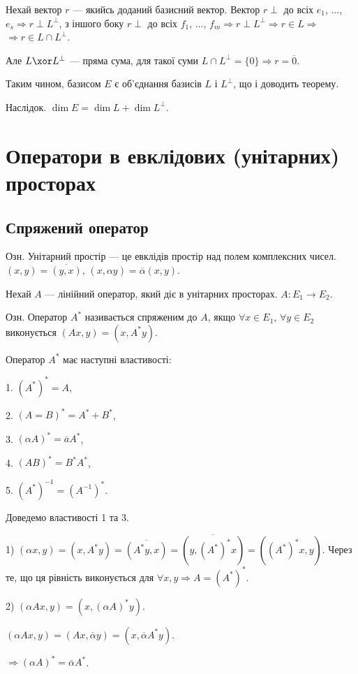Нехай вектор $r$ --- якийсь доданий базисний вектор. Вектор $r \perp$ до всіх
$e_1$, ..., $e_s \Rightarrow r \perp L^{\perp}$, з іншого боку $r \perp$ до всіх 
$f_1$, ..., $f_m \Rightarrow r \perp L^{\perp} \Rightarrow r \in L \Rightarrow$
$\Rightarrow r \in L \cap L^{\perp}$.

Але $L \xor L^{\perp}$ --- пряма сума, для такої суми $L \cap L^{\perp} = \{0\} \Rightarrow r = \overline{0}$.

Таким чином, базисом $E$ є об’єднання базисів $L$ і $L^{\perp}$, що і доводить теорему.

Наслідок. $\dim E =  \dim L + \dim L^{\perp}$.

\section{Оператори в евклідових (унітарних) просторах} %

\subsection*{Спряжений оператор}

Озн. Унітарний простір --- це евклідів простір над полем комплексних чисел.
$(x,y) = \overline{(y,x)}$, $(x,\alpha y) = \overline{\alpha}(x,y)$.

Нехай $A$ --- лінійний оператор, який діє в унітарних просторах.
$A: E_1 \rightarrow E_2$.

Озн. Оператор $A^*$ називається спряженим до $A$, якщо $\forall x \in E_1$, $\forall y \in E_2$
виконується $(A x, y) = (x, A^*y)$.

Оператор $A^*$ має наступні властивості:

1. $(A^*)^* = A$,

2. $(A = B)^* = A^* + B^*$,

3. $(\alpha A)^* = \overline{a} A^*$,

4. $(AB)^* = B^*A^*$,

5. $(A^*)^{-1} = (A^{-1})^*$.

Доведемо властивості 1 та 3.

1) $(\alpha x,y) = (x,A^* y) = \overline{(A^*y,x)} = \overline{(y,(A^*)^*x)} = ((A^*)^*x,y)$.
Через те, що ця рівність виконується для $\forall x, y \Rightarrow A = (A^*)^*$.

2) $(\alpha A x, y) = (x, (\alpha A)^* y)$.

$(\alpha A x, y) = (A x, \overline{\alpha} y) = (x, \overline{\alpha} A^* y)$.

$\Rightarrow (\alpha A)^* = \overline{\alpha} A^*$.

